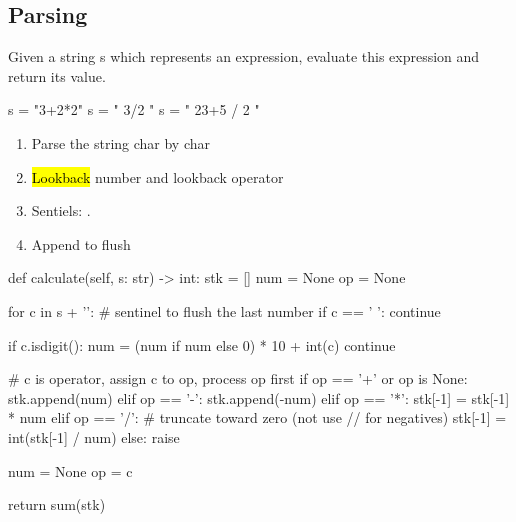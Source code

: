 \subsection{Parsing}
 Given a string s which represents an expression, evaluate this expression and return its value. 
\begin{python}
s = "3+2*2"
s = " 3/2 "
s = " 23+5 / 2 "
\end{python}
\begin{enumerate}
\item Parse the string char by char
\item \hl{Lookback} number and lookback operator
\item Sentiels: .
\item Append  to flush
\end{enumerate}
\begin{python}
def calculate(self, s: str) -> int:
    stk = []
    num = None
    op = None

    for c in s + '\0': # sentinel to flush the last number
        if c == ' ':
            continue

        if c.isdigit():
            num = (num if num else 0) * 10 + int(c)
            continue
            
        # c is operator, assign c to op, process op first
        if op == '+' or op is None:
            stk.append(num)
        elif op == '-':
            stk.append(-num)
        elif op == '*':
            stk[-1] = stk[-1] * num
        elif op == '/':
            # truncate toward zero (not use // for negatives)
            stk[-1] = int(stk[-1] / num)
        else:
            raise

        num = None        
        op = c

    return sum(stk)
\end{python}

